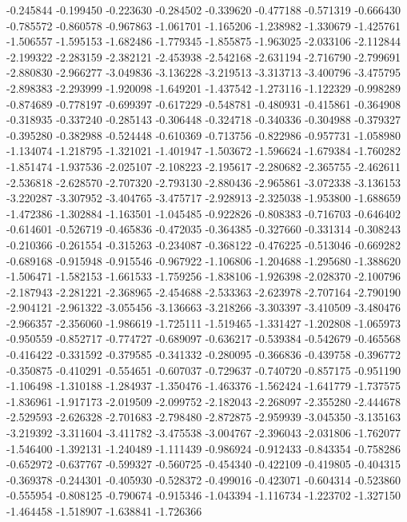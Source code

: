 -0.245844
-0.199450
-0.223630
-0.284502
-0.339620
-0.477188
-0.571319
-0.666430
-0.785572
-0.860578
-0.967863
-1.061701
-1.165206
-1.238982
-1.330679
-1.425761
-1.506557
-1.595153
-1.682486
-1.779345
-1.855875
-1.963025
-2.033106
-2.112844
-2.199322
-2.283159
-2.382121
-2.453938
-2.542168
-2.631194
-2.716790
-2.799691
-2.880830
-2.966277
-3.049836
-3.136228
-3.219513
-3.313713
-3.400796
-3.475795
-2.898383
-2.293999
-1.920098
-1.649201
-1.437542
-1.273116
-1.122329
-0.998289
-0.874689
-0.778197
-0.699397
-0.617229
-0.548781
-0.480931
-0.415861
-0.364908
-0.318935
-0.337240
-0.285143
-0.306448
-0.324718
-0.340336
-0.304988
-0.379327
-0.395280
-0.382988
-0.524448
-0.610369
-0.713756
-0.822986
-0.957731
-1.058980
-1.134074
-1.218795
-1.321021
-1.401947
-1.503672
-1.596624
-1.679384
-1.760282
-1.851474
-1.937536
-2.025107
-2.108223
-2.195617
-2.280682
-2.365755
-2.462611
-2.536818
-2.628570
-2.707320
-2.793130
-2.880436
-2.965861
-3.072338
-3.136153
-3.220287
-3.307952
-3.404765
-3.475717
-2.928913
-2.325038
-1.953800
-1.688659
-1.472386
-1.302884
-1.163501
-1.045485
-0.922826
-0.808383
-0.716703
-0.646402
-0.614601
-0.526719
-0.465836
-0.472035
-0.364385
-0.327660
-0.331314
-0.308243
-0.210366
-0.261554
-0.315263
-0.234087
-0.368122
-0.476225
-0.513046
-0.669282
-0.689168
-0.915948
-0.915546
-0.967922
-1.106806
-1.204688
-1.295680
-1.388620
-1.506471
-1.582153
-1.661533
-1.759256
-1.838106
-1.926398
-2.028370
-2.100796
-2.187943
-2.281221
-2.368965
-2.454688
-2.533363
-2.623978
-2.707164
-2.790190
-2.904121
-2.961322
-3.055456
-3.136663
-3.218266
-3.303397
-3.410509
-3.480476
-2.966357
-2.356060
-1.986619
-1.725111
-1.519465
-1.331427
-1.202808
-1.065973
-0.950559
-0.852717
-0.774727
-0.689097
-0.636217
-0.539384
-0.542679
-0.465568
-0.416422
-0.331592
-0.379585
-0.341332
-0.280095
-0.366836
-0.439758
-0.396772
-0.350875
-0.410291
-0.554651
-0.607037
-0.729637
-0.740720
-0.857175
-0.951190
-1.106498
-1.310188
-1.284937
-1.350476
-1.463376
-1.562424
-1.641779
-1.737575
-1.836961
-1.917173
-2.019509
-2.099752
-2.182043
-2.268097
-2.355280
-2.444678
-2.529593
-2.626328
-2.701683
-2.798480
-2.872875
-2.959939
-3.045350
-3.135163
-3.219392
-3.311604
-3.411782
-3.475538
-3.004767
-2.396043
-2.031806
-1.762077
-1.546400
-1.392131
-1.240489
-1.111439
-0.986924
-0.912433
-0.843354
-0.758286
-0.652972
-0.637767
-0.599327
-0.560725
-0.454340
-0.422109
-0.419805
-0.404315
-0.369378
-0.244301
-0.405930
-0.528372
-0.499016
-0.423071
-0.604314
-0.523860
-0.555954
-0.808125
-0.790674
-0.915346
-1.043394
-1.116734
-1.223702
-1.327150
-1.464458
-1.518907
-1.638841
-1.726366

